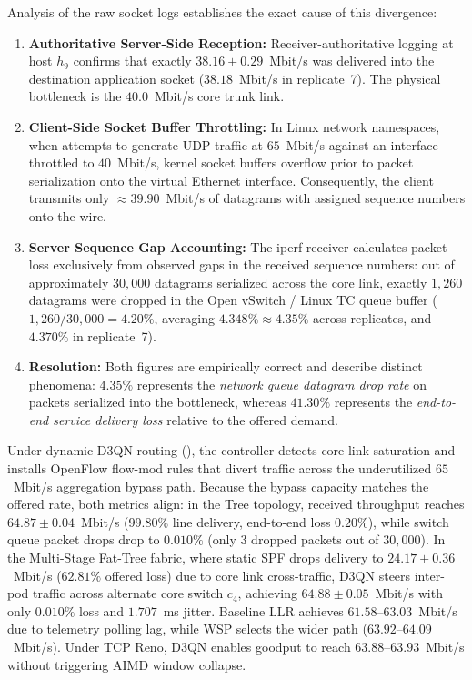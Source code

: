 \documentclass[12pt,a4paper,oneside]{report}
\newcommand{\code}[1]{\texttt{\seqsplit{#1}}}
\begin{document}
Analysis of the raw socket logs establishes the exact cause of this divergence:
\begin{enumerate}
  \item \textbf{Authoritative Server-Side Reception:} Receiver-authoritative logging at host $h_9$ confirms that exactly $38.16 \pm 0.29$~Mbit/s was delivered into the destination application socket ($38.18$~Mbit/s in replicate~7). The physical bottleneck is the $40.0$~Mbit/s core trunk link.
  \item \textbf{Client-Side Socket Buffer Throttling:} In Linux network namespaces, when \code{iperf} attempts to generate UDP traffic at $65$~Mbit/s against an interface throttled to $40$~Mbit/s, kernel socket buffers overflow prior to packet serialization onto the virtual Ethernet interface. Consequently, the client transmits only $\approx 39.90$~Mbit/s of datagrams with assigned sequence numbers onto the wire.
  \item \textbf{Server Sequence Gap Accounting:} The iperf receiver calculates packet loss exclusively from observed gaps in the received sequence numbers: out of approximately $30{,}000$ datagrams serialized across the core link, exactly $1{,}260$ datagrams were dropped in the Open vSwitch / Linux TC queue buffer ($1{,}260 / 30{,}000 = 4.20\%$, averaging $4.348\% \approx 4.35\%$ across replicates, and $4.370\%$ in replicate~7). 
  \item \textbf{Resolution:} Both figures are empirically correct and describe distinct phenomena: $4.35\%$ represents the \emph{network queue datagram drop rate} on packets serialized into the bottleneck, whereas $41.30\%$ represents the \emph{end-to-end service delivery loss} relative to the offered demand.
\end{enumerate}

Under dynamic D3QN routing (\code{D3QN-UDP}), the controller detects core link saturation and installs OpenFlow flow-mod rules that divert traffic across the underutilized $65$~Mbit/s aggregation bypass path. Because the bypass capacity matches the offered rate, both metrics align: in the Tree topology, received throughput reaches $\mathbf{64.87 \pm 0.04}$~Mbit/s ($99.80\%$ line delivery, end-to-end loss $0.20\%$), while switch queue packet drops drop to $\mathbf{0.010\%}$ (only 3 dropped packets out of $30{,}000$). In the Multi-Stage Fat-Tree fabric, where static SPF drops delivery to $24.17 \pm 0.36$~Mbit/s ($62.81\%$ offered loss) due to core link cross-traffic, D3QN steers inter-pod traffic across alternate core switch $c_4$, achieving $\mathbf{64.88 \pm 0.05}$~Mbit/s with only $0.010\%$ loss and $1.707$~ms jitter. Baseline LLR achieves $61.58\text{--}63.03$~Mbit/s due to telemetry polling lag, while WSP selects the wider path ($63.92\text{--}64.09$~Mbit/s). Under TCP Reno, D3QN enables goodput to reach $63.88\text{--}63.93$~Mbit/s without triggering AIMD window collapse.
\end{document}
